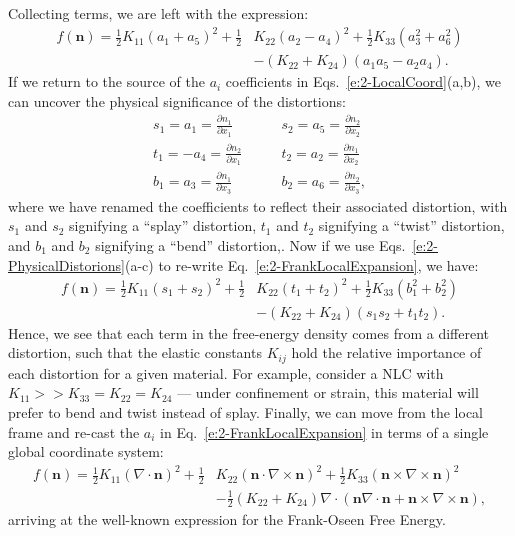 Collecting terms, we are left with the expression:
\begin{align}
  f(\mathbf{n}) = \frac{1}{2}K_{11} (a_1 + a_5)^2 + \frac{1}{2}&K_{22} (a_2 - a_4)^2 + \frac{1}{2}K_{33} (a_3^2 + a_6^2) \nonumber \\
    &- (K_{22} + K_{24}) (a_1 a_5 - a_2 a_4).\label{e:2-FrankLocalExpansion}
\end{align}
If we return to the source of the $a_i$ coefficients in Eqs.~\ref{e:2-LocalCoord}(a,b), we can uncover the physical significance of the distortions:
\label{e:2-PhysicalDistortions}
\begin{align}
  s_1 = a_1 = \frac{\partial n_1}{\partial x_1} \quad & \quad s_2 = a_5 = \frac{\partial n_2}{\partial x_2} \tag{\theequation a} \\
  t_1 = - a_4 = \frac{\partial n_2}{\partial x_1} \quad & \quad t_2 = a_2 = \frac{\partial n_1}{\partial x_2} \tag{\theequation b} \\
  b_1 =  a_3 = \frac{\partial n_1}{\partial x_3} \quad & \quad b_2 = a_6 = \frac{\partial n_2}{\partial x_3}, \tag{\theequation c}
\end{align}
where we have renamed the coefficients to reflect their associated distortion, with $s_1$ and $s_2$ signifying a ``splay'' distortion, $t_1$ and $t_2$ signifying a ``twist'' distortion, and $b_1$ and $b_2$ signifying a ``bend'' distortion,.
Now if we use Eqs.~\ref{e:2-PhysicalDistorions}(a-c) to re-write Eq.~\ref{e:2-FrankLocalExpansion}, we have:
\begin{align}
  f(\mathbf{n}) = \frac{1}{2}K_{11} (s_1 + s_2)^2 + \frac{1}{2}&K_{22} (t_1 + t_2)^2 + \frac{1}{2}K_{33} (b_1^2 + b_2^2) \nonumber \\
    & - (K_{22} + K_{24}) (s_1 s_2 + t_1 t_2).\label{e:2-FrankPhysicalExpansion}
\end{align}
Hence, we see that each term in the free-energy density comes from a different distortion, such that the elastic constants $K_{ij}$ hold the relative importance of each distortion for a given material.
For example, consider a NLC with $K_{11} >> K_{33} = K_{22} = K_{24}$ --- under confinement or strain, this material will prefer to bend and twist instead of splay.
Finally, we can move from the local frame and re-cast the $a_i$ in Eq.~\ref{e:2-FrankLocalExpansion} in terms of a single global coordinate system:
\begin{align}
  f(\mathbf{n}) = \frac{1}{2}K_{11} (\nabla \cdot \mathbf{n})^2 + \frac{1}{2}&K_{22} (\mathbf{n} \cdot \nabla \times \mathbf{n})^2 + \frac{1}{2}K_{33} (\mathbf{n} \times \nabla \times \mathbf{n})^2 \nonumber \\
    & - \frac{1}{2}(K_{22} + K_{24}) \nabla \cdot (\mathbf{n}\nabla \cdot \mathbf{n} + \mathbf{n} \times \nabla \times \mathbf{n}),\label{e:2-FrankFinalExpansion}
\end{align}
arriving at the well-known expression for the Frank-Oseen Free Energy.\\

